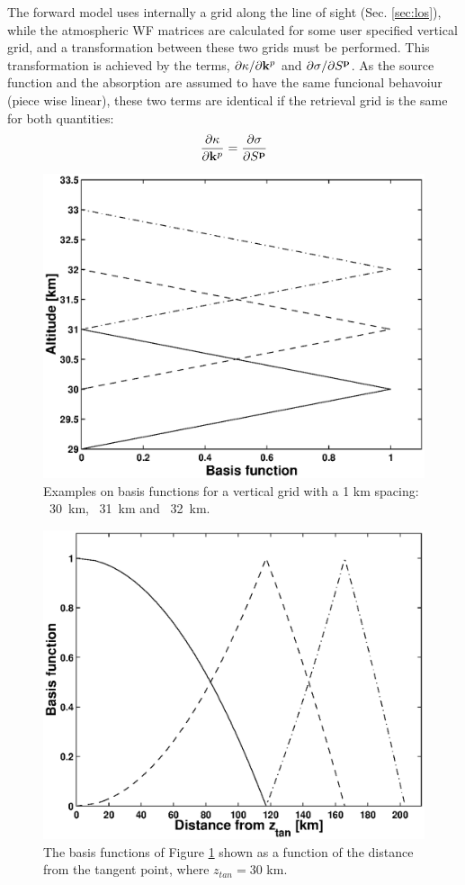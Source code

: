  
 The forward model uses
 internally a grid along the line of sight (Sec. \ref{sec:los}), while
 the atmospheric WF matrices are calculated for some user specified
 vertical grid, and a transformation between these two grids must be
 performed. This transformation is achieved by the terms,
 $\partial\kappa/ \partial \mathbf{k}^p$ and $\partial \sigma / \partial
 S^{\mathbf{p}}$. As the source function and the absorption are assumed to
 have the same funcional behavoiur (piece wise linear), these two
 terms are identical if the retrieval grid is the same for both quantities:
 \begin{equation}
   \frac{\partial \kappa}{\partial \mathbf{k}^p} =
   \frac{\partial \sigma}{\partial S^{\mathbf{p}}}
  \label{eq:wfuns:sandk}
 \end{equation}
 \begin{figure}[t]
  \begin{center}
   \includegraphics*[width=0.7\hsize]{Figs/fig_absbasis_z.eps}
   \caption{Examples on basis functions for a vertical grid with a 1 km
            spacing: \lsolid~30~km, \ldashed~31~km and \ldashdot~32~km.}
   \label{fig:wfuns:zbasis}  
  \end{center}
 \end{figure}
 \begin{figure}[t]
  \begin{center}
   \includegraphics*[width=0.7\hsize]{Figs/fig_absbasis_l.eps}
   \caption{The basis functions of Figure \ref{fig:wfuns:zbasis} shown
            as a function of the distance from the tangent point, where
            $z_{tan}=30$ km.}
   \label{fig:wfuns:lbasis}  
  \end{center}
 \end{figure}
